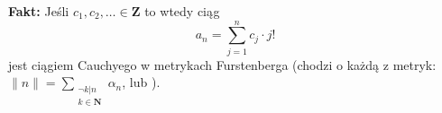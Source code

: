 \documentclass[12pt]{amsart}
\begin{document}
{\bf Fakt:} Jeśli $c_1, c_2,\ldots \in \mathbf{Z}$
to wtedy ciąg 
\[
  a_n = \sum_{j=1}^n c_j \cdot j!
\]
jest ciągiem Cauchyego w metrykach Furstenberga (chodzi o każdą z metryk: 
$\|n\| = \sum_{\substack{\neg k | n\\ k \in \mathbf{N}}} \alpha_n$, lub 
).
\end{document}

